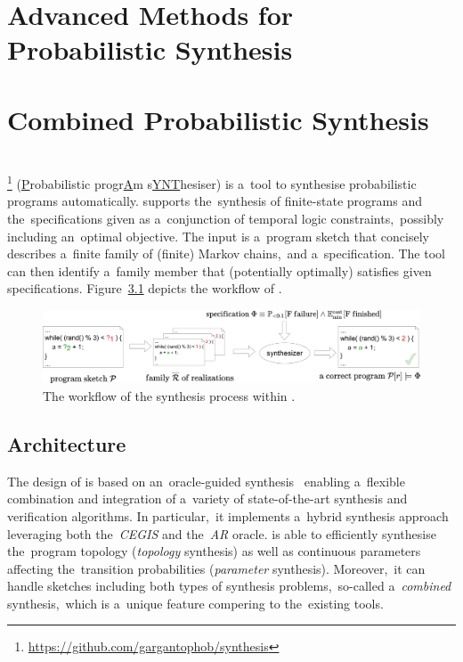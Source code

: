 \chapter{Advanced Methods for Probabilistic Synthesis}\label{chap:advanced}


\chapter{Combined Probabilistic Synthesis}\label{chap:combined}


\chapter{\toolname{}}\label{chap:paynt}

\toolname{}\footnote{\url{https://github.com/gargantophob/synthesis}} (\underline{P}robabilistic progr\underline{A}m s\underline{YNT}hesiser) is a~tool to synthesise probabilistic programs automatically.
\toolname{} supports the~synthesis of finite-state programs and the~specifications given as a~conjunction of temporal logic constraints,~possibly including an~optimal objective.
The input is a~program sketch that concisely describes a~finite family of (finite) Markov chains,~and a~specification.
The tool can then identify a~family member that (potentially optimally) satisfies given specifications.
Figure~\ref{fig:sketching} depicts the workflow of \toolname{}.

\begin{figure}[h!]
\centering
\includegraphics[width=1.0\textwidth]{figures/sketching}
\caption{The workflow of the synthesis process within \toolname{}.}%
\label{fig:sketching}%
\end{figure}

\section{Architecture}

The design of \toolname{} is based on an~oracle-guided synthesis~\cite{tacas21} enabling a~flexible combination and integration of a~variety of state-of-the-art synthesis and verification algorithms. 
In particular,~it implements a~hybrid synthesis approach leveraging both the~\emph{CEGIS} and the~\emph{AR} oracle. 
\toolname{} is able to efficiently synthesise the~program topology (\emph{topology} synthesis) as well as continuous parameters affecting the~transition probabilities (\emph{parameter} synthesis).
Moreover,~it can handle sketches including both types of synthesis problems,~so-called a~\emph{combined} synthesis,~which is a~unique feature compering to the~existing tools. 

